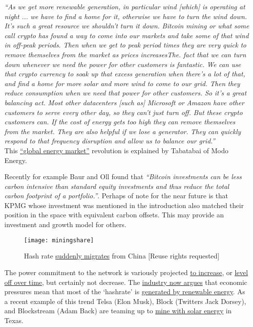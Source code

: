 \textit{``As we get more renewable generation, in particular wind [which] is operating at night ...  we have to find a home for it, otherwise we have to turn the wind down. It’s such a great resource we shouldn’t turn it down. Bitcoin mining or what some call crypto has found a way to come into our markets and take some of that wind in off-peak periods. Then when we get to peak period times they are very quick to remove themselves from the market as prices increasesThe.  fact that we can turn down whenever we need the power for other customers is fantastic. We can use that crypto currency to soak up that excess generation when there’s a lot of that, and find a home for more solar and more wind to come to our grid. Then they reduce consumption when we need that power for other customers. So it’s a great balancing act. Most other datacenters [such as] Microsoft or Amazon have other customers to serve every other day, so they can’t just turn off. But these crypto customers can. If the cost of energy gets too high they can remove themselves from the market. They are also helpful if we lose a generator. They can quickly respond to that frequency disruption and allow us to balance our grid.''}\\
This \href{https://www.citadel21.com/bitcoin-is-the-first-global-market-for-electricity-and-will-unleash-renewables}{``global energy market''} revolution is explained by Tabatabai of Modo Energy.\par Recently for example Baur and Oll found that \textit{``Bitcoin investments can be less carbon intensive than standard equity investments and thus reduce the total carbon footprint of a portfolio.''}\cite{baur2021bitcoin}. Perhaps of note for the near future is that KPMG whose investment was mentioned in the introduction also matched their position in the space with equivalent  carbon offsets. This may provide an investment and growth model for others.
\begin{figure}
  \centering
    \texttt{[image: miningshare]}
  \caption{Hash rate \href{https://ccaf.io/cbeci/ining_map}{suddenly migrates} from China [Reuse rights requested]}
  \label{fig:miningshare}
\end{figure}
The power commitment to the network is variously projected \href{https://www.nature.com/articles/s41558-018-0321-8}{to increase}, or \href{https://assets.website-files.com/614e11526f6630959fc98679/616df63a27a7ec339f5e6a80_NYDIG-BitcoinNetZero_SML.pdf}{level off over time}, but certainly not decrease. The \href{https://www.forbes.com/sites/martinrivers/2022/04/03/is-bitcoin-really-that-bad-for-the-environment/?sh=6a3203427143}{industry now argues} that economic pressures mean that most of the `hashrate' is \href{https://bitcoinminingcouncil.com/q4-bitcoin-mining-council-survey-confirms-sustainable-power-mix-and-technological-efficiency/}{generated by renewable energy}\cite{blandin20203rd}. As a recent example of this trend Telsa (Elon Musk), Block (Twitters Jack Dorsey), and Blockstream (Adam Back) are teaming up to \href{https://www.cnbc.com/2022/04/08/tesla-block-blockstream-to-mine-bitcoin-off-solar-power-in-texas.html}{mine with solar energy} in Texas.\par 
